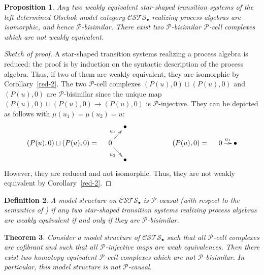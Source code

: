 \documentclass[a4paper,12pt]{amsart}
\newtheorem{thm}{Theorem}[section]
\newtheorem{prop}[thm]{Proposition}
\newtheorem{defn}[thm]{Definition}
\begin{document}
\begin{prop} \label{debut} Any two weakly equivalent star-shaped transition
systems of the left determined Olschok model category ${\mathcal{C\!S\!T\!S}}_\bullet$
realizing process algebras are isomorphic, and hence
$\mathcal{P}$-bisimilar. There exist two $\mathcal{P}$-bisimilar
$\mathcal{P}$-cell complexes which are not weakly equivalent.  \end{prop}

\begin{proof}[Sketch of proof] A star-shaped transition systems realizing a
process algebra is reduced: the proof is by induction on the syntactic
description of the process algebra. Thus, if two of them are weakly
equivalent, they are isomorphic by Corollary~\ref{red-2}.  The two
$\mathcal{P}$-cell complexes $(P(u),0)\sqcup (P(u),0)$ and $(P(u),0)$
are $\mathcal{P}$-bisimilar since the unique map $(P(u),0)\sqcup
(P(u),0) \to (P(u),0)$ is $\mathcal{P}$-injective. They can be
depicted as follows with $\mu(u_1)=\mu(u_2)=u$:
\[
\xymatrix@C=1em@R=1em
{
&& \bullet   \\
(P(u),0)\sqcup (P(u),0) = & 0 \ar@{->}[ru]^-{u_1}\ar@{->}[rd]_-{u_2}&&&&& (P(u),0) = & 0 {\ar@{->}[r]^-{{u_1}}} &\bullet  \\
&& \bullet \\
}
\]
However, they are reduced and not isomorphic. Thus, they are not
weakly equivalent by Corollary~\ref{red-2}. \end{proof}

\begin{defn} A model structure on ${\mathcal{C\!S\!T\!S}}_\bullet$ is {\rm $\mathcal{P}$-causal}
(with respect to the semantics of \cite{hdts}) if any two star-shaped
transition systems realizing process algebras are weakly equivalent if
and only if they are $\mathcal{P}$-bisimilar.  \end{defn}

\begin{thm} \label{big-pb} Consider a model structure of ${\mathcal{C\!S\!T\!S}}_\bullet$ such
that all $\mathcal{P}$-cell complexes are cofibrant and such that all
$\mathcal{P}$-injective maps are weak equivalences. Then there exist
two homotopy equivalent $\mathcal{P}$-cell complexes which are not
$\mathcal{P}$-bisimilar. In particular, this model structure is not
$\mathcal{P}$-causal. \end{thm}
\end{document}
